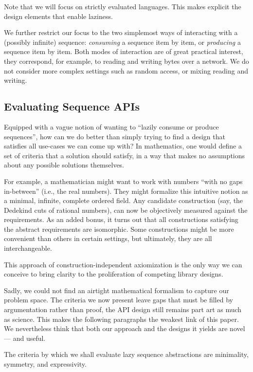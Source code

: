 \documentclass[sigplan,screen,10pt,anonymous,review]{acmart}
\begin{document}
Note that we will focus on strictly evaluated languages. This makes explicit the design elements that enable laziness.

We further restrict our focus to the two simplemost ways of interacting with a (possibly infinite) sequence: \textit{consuming} a sequence item by item, or \textit{producing} a sequence item by item. Both modes of interaction are of great practical interest, they correspond, for example, to reading and writing bytes over a network. We do not consider more complex settings such as random access, or mixing reading and writing.

\subsection{Evaluating Sequence APIs}

Equipped with a vague notion of wanting to ``lazily consume or produce sequences'', how can we do better than simply trying to find a design that satisfies all use-cases we can come up with? In mathematics, one would define a set of criteria that a solution should satisfy, in a way that makes no assumptions about any possible solutions themselves.

For example, a mathematician might want to work with numbers ``with no gaps in-between'' (i.e., the real numbers). They might formalize this intuitive notion as a minimal, infinite, complete ordered field. Any candidate construction (say, the Dedekind cuts of rational numbers), can now be objectively measured against the requirements. As an added bonus, it turns out that all constructions satisfying the abstract requirements are isomorphic. Some constructions might be more convenient than others in certain settings, but ultimately, they are all interchangeable.

This approach of construction-independent axiomization is the only way we can conceive to bring clarity to the proliferation of competing library designs.

Sadly, we could not find an airtight mathematical formalism to capture our problem space. The criteria we now present leave gaps that must be filled by argumentation rather than proof, the API design still remains part art as much as science. This makes the following paragraphs the weakest link of this paper. We nevertheless think that both our approach and the designs it yields are novel --- and useful.

The criteria by which we shall evaluate lazy sequence abstractions are minimality, symmetry, and expressivity.
\end{document}
